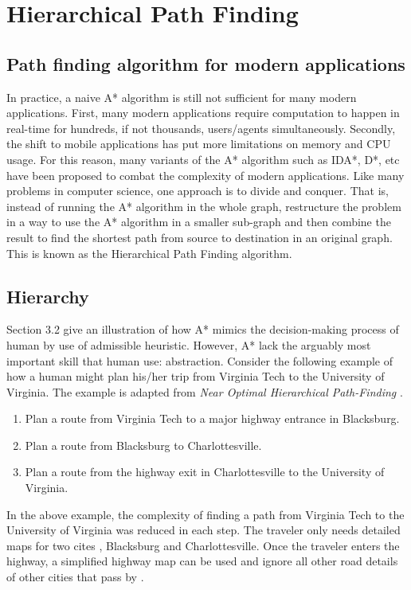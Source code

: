 \documentclass{article}
\begin{document}
\section{Hierarchical Path Finding}
\subsection{Path finding algorithm for modern applications}
In practice, a naive A* algorithm is still not sufficient for many modern applications. First, many modern applications require computation to happen in real-time for hundreds, if not thousands, users/agents simultaneously\cite{Botea2004NearOH}. Secondly, the shift to mobile applications has put more limitations on memory and CPU usage\cite{Botea2004NearOH}.
For this reason, many variants of the A* algorithm such as IDA*, D*, etc have been proposed to combat the complexity of modern applications. Like many problems in computer science, one approach is to divide and conquer. That is, instead of running the A* algorithm in the whole graph, restructure the problem in a way to use the A* algorithm in a smaller sub-graph and then combine the result to find the shortest path from source to destination in an original graph. This is known as the Hierarchical Path Finding algorithm.

\subsection{Hierarchy}
Section 3.2 give an illustration of how A* mimics the decision-making process of human by use of admissible heuristic. However, A* lack the arguably most important skill that human use: abstraction. Consider the following example of how a human might plan his/her trip from Virginia Tech to the University of Virginia. The example is adapted from \textit{Near Optimal Hierarchical Path-Finding} \cite{Botea2004NearOH}.
\begin{enumerate}
    \item Plan a route from Virginia Tech to a major highway entrance in Blacksburg.
    \item Plan a route from Blacksburg to Charlottesville.
    \item Plan a route from the highway exit in Charlottesville to the University of Virginia.
\end{enumerate}
In the above example, the complexity of finding a path from Virginia Tech to the University of Virginia was reduced in each step. The traveler only needs detailed maps for two cites \cite{Botea2004NearOH}, Blacksburg and Charlottesville. Once the traveler enters the highway, a simplified highway map can be used and ignore all other road details of other cities that pass by \cite{Botea2004NearOH}.
\end{document}
